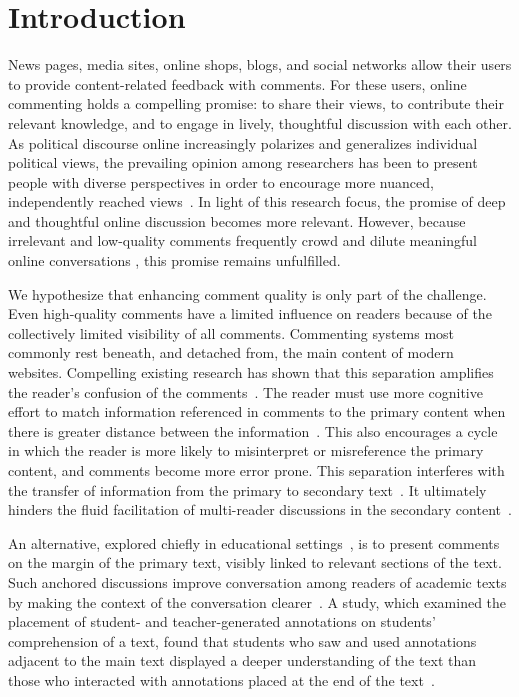\section{Introduction}

News pages, media sites, online shops, blogs, and social networks allow their users to provide content-related feedback with comments. For these users, online commenting holds a compelling promise: to share their views, to contribute their relevant knowledge, and to engage in lively, thoughtful discussion with each other. As political discourse online increasingly polarizes and generalizes individual political views, the prevailing opinion among researchers has been to present people with diverse perspectives in order to encourage more nuanced, independently reached views~\cite{ConsiderIt,Politics,NewsCube}. In light of this research focus, the promise of deep and thoughtful online discussion becomes more relevant. However, because irrelevant and low-quality comments frequently crowd and dilute meaningful online conversations \cite{CommentQuality, FlamingCommunications}, this promise remains unfulfilled.

We hypothesize that enhancing comment quality is only part of the challenge. Even high-quality comments have a limited influence on readers because of the collectively limited visibility of all comments. Commenting systems most commonly rest beneath, and detached from, the main content of modern websites. Compelling existing research has shown that this separation amplifies the reader's confusion of the comments~\cite{NewsInterfaces}. The reader must use more cognitive effort to match information referenced in comments to the primary content when there is greater distance between the information~\cite{FluidDocs}. This also encourages a cycle in which the reader is more likely to misinterpret or misreference the primary content, and comments become more error prone. This separation interferes with the transfer of information from the primary to secondary text~\cite{Brush,Guzdial,van}. It ultimately hinders the fluid facilitation of multi-reader discussions in the secondary content~\cite{AnnotationsStudents,NB}.

An alternative, explored chiefly in educational settings~\cite{Brush,Guzdial,van,AnnotationsStudents}, is to present comments on the margin of the primary text, visibly linked to relevant sections of the text. Such anchored discussions improve conversation among readers of academic texts by making the context of the conversation clearer~\cite{Brush,Guzdial,van}. A study, which examined the placement of student- and teacher-generated annotations on students' comprehension of a text, found that students who saw and used annotations adjacent to the main text displayed a deeper understanding of the text than those who interacted with annotations placed at the end of the text~\cite{AnnotationsStudents}.

